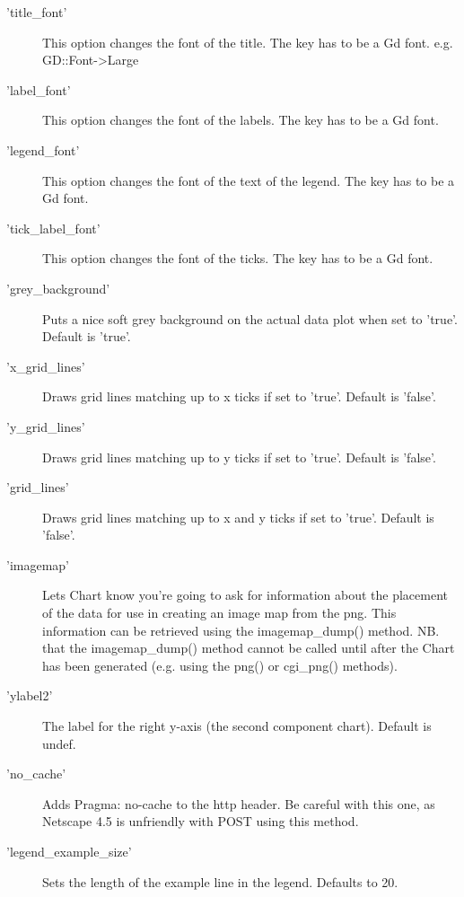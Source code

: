 \begin{description}
\item['title\_font'] This option changes the font of the title. 
               The key has to be a Gd font. e.g. GD::Font->Large 

\item['label\_font'] This option changes the font of the labels. The key has to be a Gd font. 

\item['legend\_font'] This option changes the font of the text of the legend. The key has to be a Gd font. 

\item['tick\_label\_font'] This option changes the font of the ticks. The key has to be a Gd font. 

\item['grey\_background']Puts a nice soft grey background on the actual data plot when set to 'true'.  Default is 'true'.

\item['x\_grid\_lines']Draws grid lines matching up to x ticks if set to 'true'. Default is 'false'.

\item['y\_grid\_lines']Draws grid lines matching up to y ticks if set to 'true'. Default is 'false'.

\item['grid\_lines']Draws grid lines matching up to x and y ticks if set to 'true'. Default is 'false'. 

\item['imagemap']Lets Chart know you're going to ask for information 
        about the placement of the data for use in 
         creating an image map from the png. This information can be retrieved using the imagemap\_dump() method.         NB. that the imagemap\_dump() method cannot be called until 
         after the Chart has been generated (e.g. using the png() or cgi\_png() methods).

\item['ylabel2']The label for the right y-axis (the second component chart).  Default is undef.

\item['no\_cache']Adds Pragma: no-cache to the http header. 
           Be careful with this one, as Netscape 4.5 is     unfriendly with POST using this method.

\item['legend\_example\_size'] Sets the length of the example line in the legend. Defaults to 20.
\end{description}

